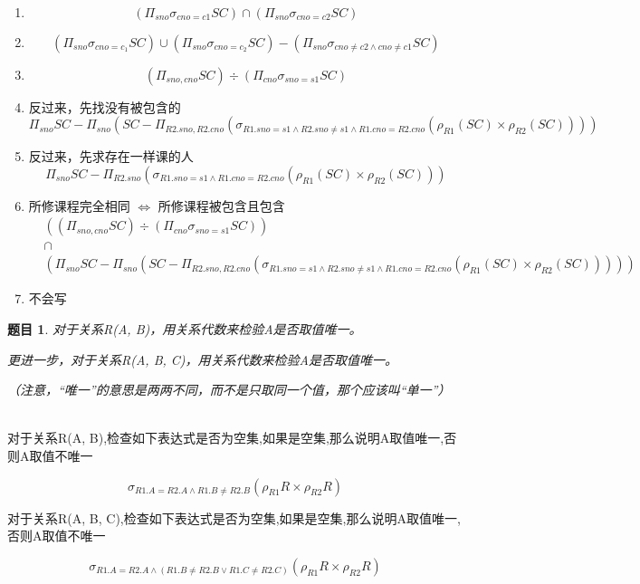 \documentclass[12pt]{article} %
\theoremstyle{problemstyle} %
\newtheorem{problem}{题目} %
\newenvironment{solution}
  {%
    \renewcommand\qedsymbol{$\blacksquare$}%
    \proof[\textit{解答}]\mbox{}\vspace{-4ex}\\%
  }
  {\endproof}
\begin{document}
\begin{solution}

  \begin{enumerate}
    \item 
    \[
      (\Pi_{sno}\sigma_{cno=c1}SC)\cap (\Pi_{sno}\sigma_{cno=c2}SC)
    \]
    \item 
    \[
      (\Pi_{sno}\sigma_{cno=c_1}SC)\cup(\Pi_{sno}\sigma_{cno=c_2}SC) - (\Pi_{sno}\sigma_{cno\neq c2\wedge cno\neq c1}SC)
    \]
    \item 
    \[
      (\Pi_{sno, cno}SC) \div (\Pi_{cno}\sigma_{sno=s1}SC)
    \]
    \item 反过来，先找没有被包含的
    \[
      \Pi_{sno}SC-\Pi_{sno}(SC-\Pi_{R2.sno, R2.cno}(\sigma_{R1.sno=s1\wedge R2.sno\neq s1\wedge R1.cno=R2.cno}(\rho_{R1}(SC)\times \rho_{R2}(SC))))
    \]
    \item 反过来，先求存在一样课的人
    \[
      \Pi_{sno}SC-\Pi_{R2.sno}(\sigma_{R1.sno=s1\wedge R1.cno=R2.cno}(\rho_{R1}(SC)\times \rho_{R2}(SC)))
    \]
    \item 所修课程完全相同 $\Leftrightarrow$ 所修课程被包含且包含
    \begin{align*}
      &((\Pi_{sno, cno}SC) \div (\Pi_{cno}\sigma_{sno=s1}SC))\\
      &\cap\\
      &(\Pi_{sno}SC-\Pi_{sno}(SC-\Pi_{R2.sno, R2.cno}(\sigma_{R1.sno=s1\wedge R2.sno\neq s1\wedge R1.cno=R2.cno}(\rho_{R1}(SC)\times \rho_{R2}(SC)))))
    \end{align*}
    \item 不会写

  \end{enumerate}

\end{solution}

\begin{problem}
对于关系R(A, B)，用关系代数来检验A是否取值唯一。

更进一步，对于关系R(A, B, C)，用关系代数来检验A是否取值唯一。

（注意，“唯一”的意思是两两不同，而不是只取同一个值，那个应该叫“单一”）  
\end{problem}

\begin{solution}

对于关系R(A, B),检查如下表达式是否为空集,如果是空集,那么说明A取值唯一,否则A取值不唯一

\[
\sigma_{R1.A=R2.A\wedge R1.B\neq R2.B}(\rho_{R1}R\times \rho_{R2}R)
\]

对于关系R(A, B, C),检查如下表达式是否为空集,如果是空集,那么说明A取值唯一,否则A取值不唯一

\[
\sigma_{R1.A=R2.A\wedge (R1.B\neq R2.B\vee R1.C\neq R2.C)}(\rho_{R1}R\times \rho_{R2}R)
\]

\end{solution}
\end{document}
